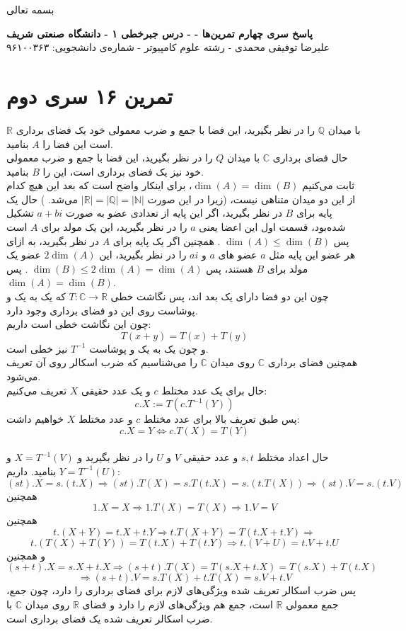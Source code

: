 \documentclass[12pt,a4paper]{article}
\begin{document}
\begin{center}
	بسمه تعالی
\end{center}
\begin{center}
	\textbf{
		پاسخ سری چهارم تمرین‌ها
		-
		- درس جبرخطی ۱ - دانشگاه صنعتی شریف}
	\\
	علیرضا توفیقی محمدی - رشته علوم کامپیوتر - شماره‌ی دانشجویی: ۹۶۱۰۰۳۶۳
\end{center}
\section{تمرین ۱۶ سری دوم}
$\mathbb{R}$
با میدان 
$\mathbb{Q}$
را در نظر بگیرید، این فضا با جمع و ضرب معمولی خود یک فضای برداری است این فضا را $A$ بنامید.
\\
حال فضای برداری $\mathbb{C}$ با میدان $Q$ را در نظر بگیرید، این فضا با جمع و ضرب معمولی خود نیز یک فضای برداری است، این را $B$ بنامید.
\\
ثابت می‌کنیم 
$\dim(A) = \dim(B)$،
برای اینکار واضح است که بعد این هیچ کدام از این دو میدان متناهی نیست، (زیرا در این صورت 
$|\mathbb{R}| = |\mathbb{Q}| = |\mathbb{N}|$
می‌شد.
)
حال یک پایه برای $B$ در نظر بگیرید، اگر این پایه از تعدادی عضو به صورت $a + bi$ تشکیل شده‌بود، قسمت اول این اعضا یعنی $a$ را در نظر بگیرید، این یک مولد برای $A$ است پس 
$\dim(A) \leq \dim(B)$
. همچنین اگر یک پایه برای $A$ در نظر بگیرید، به ازای هر عضو این پایه مثل $a$ عضو های $a$ و $ai$ را در نظر بگیرید، این $2\dim(A)$ عضو یک مولد برای $B$ هستند، پس
$\dim(B) \leq 2\dim(A) = \dim(A)$
.
پس $\dim(A) = \dim(B)$.
\\
چون این دو فضا دارای یک بعد اند، پس نگاشت خطی 
$T: \mathbb{C} \rightarrow \mathbb{R}$
 که یک به یک و پوشاست روی این دو فضای برداری وجود دارد.\\
چون این نگاشت خطی است داریم:
$$
T(x+y) = T(x) + T(y)$$
و چون یک به یک و پوشاست $T^{-1}$ نیز خطی است.
\\
همچنین فضای برداری $\mathbb{C}$ روی میدان $\mathbb{C}$ را می‌شناسیم که ضرب اسکالر روی آن تعریف می‌شود.
\\
حال برای یک عدد مختلط $c$ و یک عدد حقیقی $X$ تعریف می‌کنیم:
$$
c.X := T(c.T^{-1}(Y))
$$
پس طبق تعریف بالا برای عدد مختلط $c$ و عدد مختلط $X$ خواهیم داشت:
$$
c.X = Y \iff c.T(X) = T(Y)
$$
\\
حال اعداد مختلط $s,t$ و عدد حقیقی $V$ و $U$ را در نظر بگیرید و 
$X = T^{-1}(V)$ و
$Y = T^{-1}(U)$
بنامید. داریم:
$$
(st).X = s.(t.X) \Rightarrow (st).T(X) = s.T(t.X) = s.(t.T(X)) \Rightarrow (st).V = s.(t.V)
$$
همچنین
$$
1.X = X \Rightarrow 1.T(X) = T(X) \Rightarrow 1.V = V
$$
همچنین
$$
t.(X+Y) = t.X + t.Y \Rightarrow t.T(X+Y) = T(t.X + t.Y) \Rightarrow
$$$$
t.(T(X) + T(Y)) = T(t.X) + T(t.Y) \Rightarrow t.(V + U) = t.V + t.U
$$
و همچنین
$$
(s+t).X = s.X + t.X \Rightarrow (s+t).T(X) = T(s.X + t.X) = T(s.X) + T(t.X)$$$$ \Rightarrow (s+t).V = s.T(X) + t.T(X) = s.V + t.V
$$
پس ضرب اسکالر تعریف شده ویژگی‌های لازم برای فضای برداری را دارد، چون جمع، جمع معمولی $\mathbb{R}$ است، جمع هم ویژگی‌های لازم را دارد و فضای $\mathbb{R}$ روی میدان $\mathbb{C}$ با ضرب اسکالر تعریف شده یک فضای برداری است.
\end{document}
